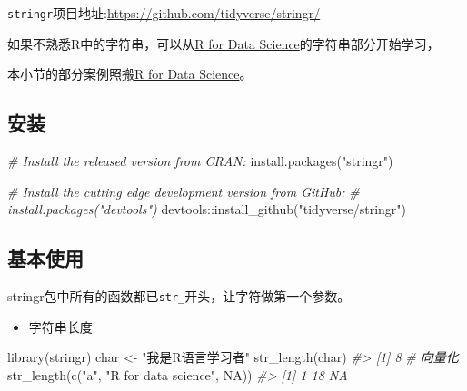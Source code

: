 \documentclass[
]{book}
\newenvironment{Shaded}{\begin{snugshade}}{\end{snugshade}}
\newcommand{\CommentTok}[1]{\textcolor[rgb]{0.56,0.35,0.01}{\textit{#1}}}
\newcommand{\ConstantTok}[1]{\textcolor[rgb]{0.00,0.00,0.00}{#1}}
\newcommand{\FunctionTok}[1]{\textcolor[rgb]{0.00,0.00,0.00}{#1}}
\newcommand{\NormalTok}[1]{#1}
\newcommand{\OtherTok}[1]{\textcolor[rgb]{0.56,0.35,0.01}{#1}}
\newcommand{\SpecialCharTok}[1]{\textcolor[rgb]{0.00,0.00,0.00}{#1}}
\newcommand{\StringTok}[1]{\textcolor[rgb]{0.31,0.60,0.02}{#1}}
\providecommand{\tightlist}{%
  \setlength{\itemsep}{0pt}\setlength{\parskip}{0pt}}
\begin{document}
\texttt{stringr}项目地址:\url{https://github.com/tidyverse/stringr/}

如果不熟悉R中的字符串，可以从\href{https://r4ds.had.co.nz/strings.html}{R for Data Science}的字符串部分开始学习，

本小节的部分案例照搬\href{https://r4ds.had.co.nz/strings.html}{R for Data Science}。

\hypertarget{stringr-install}{%
\subsection{安装}\label{stringr-install}}

\begin{Shaded}
\begin{Highlighting}[]
\CommentTok{\# Install the released version from CRAN:}
\FunctionTok{install.packages}\NormalTok{(}\StringTok{"stringr"}\NormalTok{)}

\CommentTok{\# Install the cutting edge development version from GitHub:}
\CommentTok{\# install.packages("devtools")}
\NormalTok{devtools}\SpecialCharTok{::}\FunctionTok{install\_github}\NormalTok{(}\StringTok{"tidyverse/stringr"}\NormalTok{)}
\end{Highlighting}
\end{Shaded}

\hypertarget{stringr-usage}{%
\subsection{基本使用}\label{stringr-usage}}

stringr包中所有的函数都已\texttt{str\_}开头，让字符做第一个参数。

\begin{itemize}
\tightlist
\item
  字符串长度
\end{itemize}

\begin{Shaded}
\begin{Highlighting}[]
\FunctionTok{library}\NormalTok{(stringr)}
\NormalTok{char }\OtherTok{\textless{}{-}} \StringTok{"我是R语言学习者"}
\FunctionTok{str\_length}\NormalTok{(char)}
\CommentTok{\#\textgreater{} [1] 8}
\CommentTok{\# 向量化}
\FunctionTok{str\_length}\NormalTok{(}\FunctionTok{c}\NormalTok{(}\StringTok{"a"}\NormalTok{, }\StringTok{"R for data science"}\NormalTok{, }\ConstantTok{NA}\NormalTok{))}
\CommentTok{\#\textgreater{} [1]  1 18 NA}
\end{Highlighting}
\end{Shaded}
\end{document}
